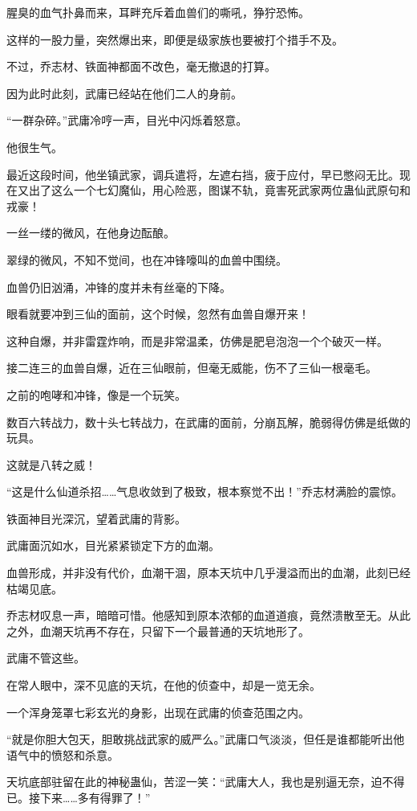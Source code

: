 \begin{this_body}
腥臭的血气扑鼻而来，耳畔充斥着血兽们的嘶吼，狰狞恐怖。

这样的一股力量，突然爆出来，即便是级家族也要被打个措手不及。

不过，乔志材、铁面神都面不改色，毫无撤退的打算。

因为此时此刻，武庸已经站在他们二人的身前。

“一群杂碎。”武庸冷哼一声，目光中闪烁着怒意。

他很生气。

最近这段时间，他坐镇武家，调兵遣将，左遮右挡，疲于应付，早已憋闷无比。现在又出了这么一个七幻魔仙，用心险恶，图谋不轨，竟害死武家两位蛊仙武原句和戎豪！

一丝一缕的微风，在他身边酝酿。

翠绿的微风，不知不觉间，也在冲锋嚎叫的血兽中围绕。

血兽仍旧汹涌，冲锋的度并未有丝毫的下降。

眼看就要冲到三仙的面前，这个时候，忽然有血兽自爆开来！

这种自爆，并非雷霆炸响，而是非常温柔，仿佛是肥皂泡泡一个个破灭一样。

接二连三的血兽自爆，近在三仙眼前，但毫无威能，伤不了三仙一根毫毛。

之前的咆哮和冲锋，像是一个玩笑。

数百六转战力，数十头七转战力，在武庸的面前，分崩瓦解，脆弱得仿佛是纸做的玩具。

这就是八转之威！

“这是什么仙道杀招……气息收敛到了极致，根本察觉不出！”乔志材满脸的震惊。

铁面神目光深沉，望着武庸的背影。

武庸面沉如水，目光紧紧锁定下方的血潮。

血兽形成，并非没有代价，血潮干涸，原本天坑中几乎漫溢而出的血潮，此刻已经枯竭见底。

乔志材叹息一声，暗暗可惜。他感知到原本浓郁的血道道痕，竟然溃散至无。从此之外，血潮天坑再不存在，只留下一个最普通的天坑地形了。

武庸不管这些。

在常人眼中，深不见底的天坑，在他的侦查中，却是一览无余。

一个浑身笼罩七彩玄光的身影，出现在武庸的侦查范围之内。

“就是你胆大包天，胆敢挑战武家的威严么。”武庸口气淡淡，但任是谁都能听出他语气中的愤怒和杀意。

天坑底部驻留在此的神秘蛊仙，苦涩一笑：“武庸大人，我也是别逼无奈，迫不得已。接下来……多有得罪了！”


\end{this_body}
